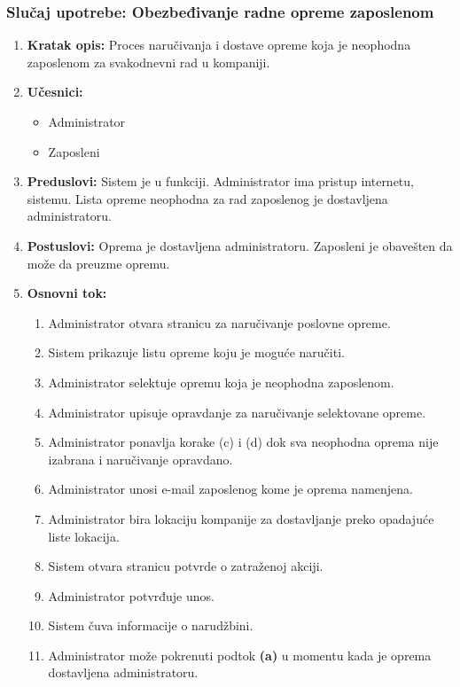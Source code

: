 \documentclass[a4paper]{article}
\begin{document}
\subsubsection{Slučaj upotrebe: Obezbeđivanje radne opreme zaposlenom}
\begin{enumerate}
    \item \textbf{Kratak opis:} Proces naručivanja i dostave opreme koja je neophodna zaposlenom za svakodnevni rad u kompaniji.
    \item \textbf{Učesnici:}
        \begin{itemize}
            \item Administrator
            \item Zaposleni
        \end{itemize}
    \item \textbf{Preduslovi:} Sistem je u funkciji. Administrator ima pristup internetu, sistemu. Lista opreme neophodna za rad zaposlenog je dostavljena administratoru.
    \item \textbf{Postuslovi:} Oprema je dostavljena administratoru. Zaposleni je obavešten da može da preuzme opremu.
    \item \textbf{Osnovni tok:}
        \begin{enumerate}
            \item Administrator otvara stranicu za naručivanje poslovne opreme.
            \item Sistem prikazuje listu opreme koju je moguće naručiti.
            \item Administrator selektuje opremu koja je neophodna zaposlenom.
            \item Administrator upisuje opravdanje za naručivanje selektovane opreme.
            \item Administrator ponavlja korake (c) i (d) dok sva neophodna oprema nije izabrana i naručivanje opravdano.
            \item Administrator unosi e-mail zaposlenog kome je oprema namenjena.
            \item Administrator bira lokaciju kompanije za dostavljanje preko opadajuće liste lokacija.
            \item Sistem otvara stranicu potvrde o zatraženoj akciji.
            \item Administrator potvrđuje unos.
            \item Sistem čuva informacije o narudžbini.
            \item Administrator može pokrenuti podtok \textbf{(a)} u momentu kada je oprema dostavljena administratoru.

\end{enumerate}
\end{enumerate}
\end{document}
